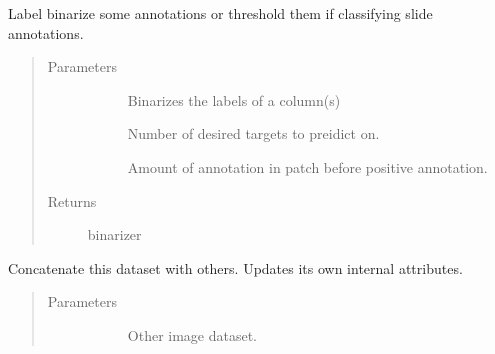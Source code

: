\documentclass[letterpaper,10pt,english]{sphinxmanual}
\begin{document}
\begin{fulllineitems}
\begin{fulllineitems}
\label{\detokenize{index:pathflowai.datasets.DynamicImageDataset.binarize_annotations}}
Label binarize some annotations or threshold them if classifying slide annotations.
\begin{quote}\begin{description}
\item[{Parameters}] \leavevmode\begin{description}
\item[{}] \leavevmode
Binarizes the labels of a column(s)

\item[{}] \leavevmode
Number of desired targets to preidict on.

\item[{}] \leavevmode
Amount of annotation in patch before positive annotation.

\end{description}

\item[{Returns}] \leavevmode\begin{description}
\item[{binarizer}] \leavevmode
\end{description}

\end{description}\end{quote}

\end{fulllineitems}


\begin{fulllineitems}
\label{\detokenize{index:pathflowai.datasets.DynamicImageDataset.concat}}
Concatenate this dataset with others. Updates its own internal attributes.
\begin{quote}\begin{description}
\item[{Parameters}] \leavevmode\begin{description}
\item[{}] \leavevmode
Other image dataset.


\end{description}
\end{description}
\end{quote}
\end{fulllineitems}
\end{fulllineitems}
\end{document}
